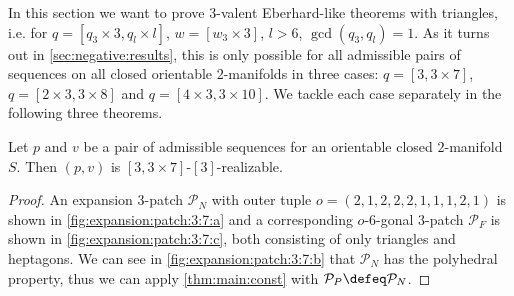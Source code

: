 \label{sec:3:3}

In this section we want to prove $3$-valent {\sc Eberhard}-like theorems with triangles, i.e. for $q = [q_3 \times 3, q_l \times l]$, $w = [w_3 \times 3]$, $l > 6$, $\gcd(q_3, q_l) = 1$. As it turns out in \autoref{sec:negative:results}, this is only possible for all admissible pairs of sequences on all closed orientable $2$-manifolds in three cases: $q = [3, 3 \times 7]$, $q = [2 \times 3, 3 \times 8]$ and $q = [4 \times 3, 3 \times 10]$. We tackle each case separately in the following three theorems.
\clearpage
\begin{theorem}
  Let $p$ and $v$ be a pair of admissible sequences for an orientable closed $2$-manifold $S$. Then $(p, v)$ is $[3, 3 \times 7]$-$[3]$-realizable.
  \begin{proof}
    An expansion $3$-patch $\mathcal{P}_N$ with outer tuple $o = (2, 1, 2, 2, 2, 1, 1, 1, 2, 1)$ is shown in \autoref{fig:expansion:patch:3:7:a} and a corresponding $o$-$6$-gonal $3$-patch $\mathcal{P}_F$ is shown in \autoref{fig:expansion:patch:3:7:c}, both consisting of only triangles and heptagons. We can see in \autoref{fig:expansion:patch:3:7:b} that $\mathcal{P}_N$ has the polyhedral property, thus we can apply \autoref{thm:main:const} with $\mathcal{P}_P \defeq \mathcal{P}_N$.
  \end{proof}
\end{theorem}
{\par\vspace*{\fill}}
